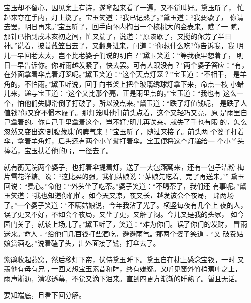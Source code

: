 宝玉却不留心，因见案上有诗，遂拿起来看了一遍，又不觉叫好。黛玉听了，
忙起来夺在手内，灯上烧了。宝玉笑道：“我已记熟了。”黛玉道：“我要歇了，
你请去罢，明日再来。”宝玉听了，回手向怀内掏出一个核桃大的金表来，瞧了一
瞧，那针已指到戌末亥初之间，忙又揣了，说道：“原该歇了，又搅的你劳了半日
神。”说着，披蓑戴笠出去了，又翻身进来，问道：“你想什么吃?你告诉我，我
明儿一早回老太太，岂不比老婆子们说的明白？”黛玉笑道：“等我夜里想着了，
明日一早告诉你。你听雨越发紧了，快去罢。可有人跟没有？”两个婆子答应：“有，
在外面拿着伞点着灯笼呢。”黛玉笑道：“这个天点灯笼？”宝玉道：“不相干，
是羊角的，不怕雨。”黛玉听说，回手向书架上把个玻璃绣球灯拿下来，命点一枝
小蜡儿来，递与宝玉道：“这个又比那个亮，正是雨里点的。”宝玉道：“我也有
这么一个，怕他们失脚滑倒了打破了，所以没点来。”黛玉道：“跌了灯值钱呢，
是跌了人值钱?你又穿不惯木屐子。那灯笼叫他们前头点着，这个又轻巧又亮，原
是雨里自己拿着的。你自己手里拿着这个，岂不好?明儿再送来。就失了手也有限
的，怎么忽然又变出这‘剖腹藏珠’的脾气来！”宝玉听了，随过来接了。前头两
个婆子打着伞，拿着羊角灯，后头还有两个小丫鬟打着伞。宝玉便将这个灯递给一
个小丫头捧着，宝玉扶着他的肩，一径去了。

就有蘅芜院两个婆子，也打着伞提着灯，送了一大包燕窝来，还有一包子洁粉
梅片雪花洋糖。说：“这比买的强。我们姑娘说：‘姑娘先吃着，完了再送来。’”
黛玉回说：“费心。”命他：“外头坐了吃茶。”婆子笑道：“不喝茶了，我们还
有事呢。”黛玉笑道：“我也知道你们忙。如今天又凉，夜又长，越发该会个夜局，
赌两场了。”一个婆子笑道：“不瞒姑娘说，今年我沾了光了。横竖每夜有几个上
夜的人，误了更又不好，不如会个夜局，又坐了更，又解了闷。今儿又是我的头家，
如今园门关了，就该上场儿了。”黛玉听了，笑道：“难为你们。误了你们的发财，
冒雨送来。”命人：“给他们几百钱打些酒吃，避避雨气。”那两个婆子笑道：“又
破费姑娘赏酒吃。”说着磕了头，出外面接了钱，打伞去了。

紫鹃收起燕窝，然后移灯下帘，伏侍黛玉睡下。黛玉自在枕上感念宝钗，一时
又羡他有母有兄；一回又想宝玉素昔和睦，终有嫌疑。又听见窗外竹梢蕉叶之上，
雨声淅沥，清寒透幕，不觉又滴下泪来。直到四更方渐渐的睡熟了。暂且无话。

要知端底，且看下回分解。